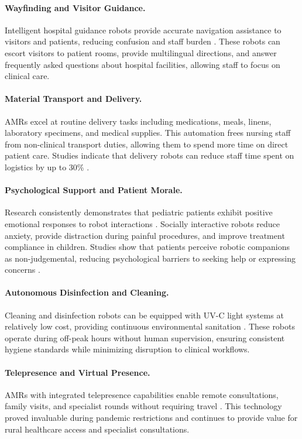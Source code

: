 \paragraph{Wayfinding and Visitor Guidance.}
Intelligent hospital guidance robots provide accurate navigation assistance to visitors and patients, reducing confusion and staff burden \cite{pmc2024nursing}. These robots can escort visitors to patient rooms, provide multilingual directions, and answer frequently asked questions about hospital facilities, allowing staff to focus on clinical care.

\paragraph{Material Transport and Delivery.}
AMRs excel at routine delivery tasks including medications, meals, linens, laboratory specimens, and medical supplies. This automation frees nursing staff from non-clinical transport duties, allowing them to spend more time on direct patient care. Studies indicate that delivery robots can reduce staff time spent on logistics by up to 30\% \cite{mdpi2024}.

\paragraph{Psychological Support and Patient Morale.}
Research consistently demonstrates that pediatric patients exhibit positive emotional responses to robot interactions \cite{beran2013}. Socially interactive robots reduce anxiety, provide distraction during painful procedures, and improve treatment compliance in children. Studies show that patients perceive robotic companions as non-judgemental, reducing psychological barriers to seeking help or expressing concerns \cite{ahu2024}.

\paragraph{Autonomous Disinfection and Cleaning.}
Cleaning and disinfection robots can be equipped with UV-C light systems at relatively low cost, providing continuous environmental sanitation \cite{intel2024}. These robots operate during off-peak hours without human supervision, ensuring consistent hygiene standards while minimizing disruption to clinical workflows.

\paragraph{Telepresence and Virtual Presence.}
AMRs with integrated telepresence capabilities enable remote consultations, family visits, and specialist rounds without requiring travel \cite{garingo2016}. This technology proved invaluable during pandemic restrictions and continues to provide value for rural healthcare access and specialist consultations.

